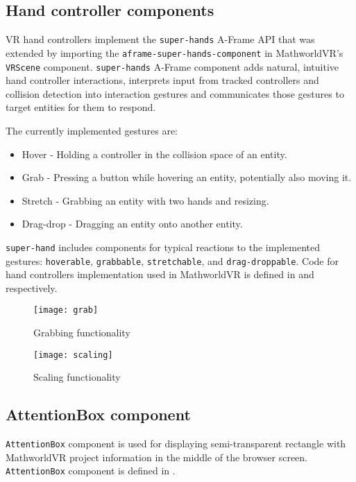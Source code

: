 \newpage
\subsection{Hand controller components}
VR hand controllers implement the \texttt{super-hands} A-Frame API that was extended by importing the \texttt{aframe-super-hands-component} in MathworldVR's \texttt{VRScene} component. \texttt{super-hands} A-Frame component adds natural, intuitive hand controller interactions, interprets input from tracked controllers and collision detection into interaction gestures and communicates those gestures to target entities for them to respond.

The currently implemented gestures are:
\begin{itemize}
\item{Hover - Holding a controller in the collision space of an entity.}
\item{Grab - Pressing a button while hovering an entity, potentially also moving it.}
\item{Stretch - Grabbing an entity with two hands and resizing.}
\item{Drag-drop - Dragging an entity onto another entity.}
\end{itemize}

\texttt{super-hand} includes components for typical reactions to the implemented gestures: \texttt{hoverable}, \texttt{grabbable}, \texttt{stretchable}, and \texttt{drag-droppable}. Code for hand controllers implementation used in MathworldVR is defined in  and  respectively.

\begin{figure}[ht!]
\centering
\texttt{[image: grab]}
\caption{Grabbing functionality}
\label{r:5}
\end{figure}

\begin{figure}[ht!]
\centering
\texttt{[image: scaling]}
\caption{Scaling functionality}
\label{r:6}
\end{figure}

\newpage
\subsection{AttentionBox component}
\texttt{AttentionBox} component is used for displaying semi-transparent rectangle with MathworldVR project information in the middle of the browser screen. \texttt{AttentionBox} component is defined in .

